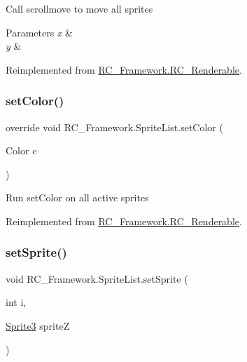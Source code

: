 Call scrollmove to move all sprites 


\begin{DoxyParams}{Parameters}
{\em x} & \\
\hline
{\em y} & \\
\hline
\end{DoxyParams}


Reimplemented from \mbox{\hyperlink{class_r_c___framework_1_1_r_c___renderable_a21e5b1a68c7382443c82e7296fd2209a}{R\+C\+\_\+\+Framework.\+R\+C\+\_\+\+Renderable}}.

\mbox{\label{class_r_c___framework_1_1_sprite_list_aba7adceacb386357f811b5099d8885ca}} 
\subsubsection{\texorpdfstring{set\+Color()}{setColor()}}
{\footnotesize\ttfamily override void R\+C\+\_\+\+Framework.\+Sprite\+List.\+set\+Color (\begin{DoxyParamCaption}\item[{Color}]{c }\end{DoxyParamCaption})\hspace{0.3cm}{\ttfamily [virtual]}}



Run set\+Color on all active sprites 



Reimplemented from \mbox{\hyperlink{class_r_c___framework_1_1_r_c___renderable_a73bf15681dc31644705e509c53f68833}{R\+C\+\_\+\+Framework.\+R\+C\+\_\+\+Renderable}}.

\mbox{\label{class_r_c___framework_1_1_sprite_list_a9ddabec41f012b498c09368318c1941c}} 
\subsubsection{\texorpdfstring{set\+Sprite()}{setSprite()}}
{\footnotesize\ttfamily void R\+C\+\_\+\+Framework.\+Sprite\+List.\+set\+Sprite (\begin{DoxyParamCaption}\item[{int}]{i,  }\item[{\mbox{\hyperlink{class_r_c___framework_1_1_sprite3}{Sprite3}}}]{spriteZ }\end{DoxyParamCaption})}



